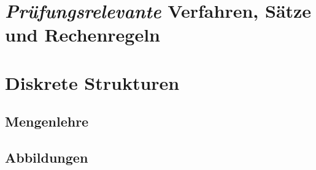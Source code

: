 \documentclass[10pt,a4paper]{article}
\begin{document}
\section*{\textit{Prüfungsrelevante} Verfahren, Sätze und Rechenregeln}
\section{Diskrete Strukturen}



\subsection{Mengenlehre}



\subsection{Abbildungen}
\end{document}
